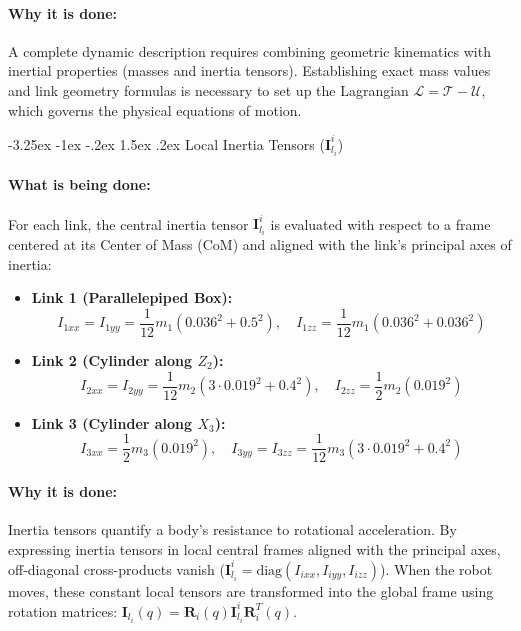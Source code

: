\documentclass[11pt, a4paper]{article}
\makeatletter
\renewcommand{\subsection}{\@startsection{subsection}{2}{\z@}%
    {-3.25ex \@plus -1ex \@minus -.2ex}%
    {1.5ex \@plus .2ex}%
    {\normalfont\large\bfseries\color{brandaccent}}}
\makeatother
\begin{document}
\paragraph{Why it is done:}
A complete dynamic description requires combining geometric kinematics with inertial properties (masses and inertia tensors). Establishing exact mass values and link geometry formulas is necessary to set up the Lagrangian $\mathcal{L} = \mathcal{T} - \mathcal{U}$, which governs the physical equations of motion.

\subsection{Local Inertia Tensors (\texorpdfstring{$\mathbf{I}_{l_i}^i$}{I\_li\_i})}
\paragraph{What is being done:}
For each link, the central inertia tensor $\mathbf{I}_{l_i}^i$ is evaluated with respect to a frame centered at its Center of Mass (CoM) and aligned with the link's principal axes of inertia:
\begin{itemize}[leftmargin=1.5em]
    \item \textbf{Link 1 (Parallelepiped Box):}
    \begin{equation}
        I_{1xx} = I_{1yy} = \frac{1}{12} m_1 (0.036^2 + 0.5^2), \quad I_{1zz} = \frac{1}{12} m_1 (0.036^2 + 0.036^2)
    \end{equation}
    \item \textbf{Link 2 (Cylinder along $Z_2$):}
    \begin{equation}
        I_{2xx} = I_{2yy} = \frac{1}{12} m_2 (3 \cdot 0.019^2 + 0.4^2), \quad I_{2zz} = \frac{1}{2} m_2 (0.019^2)
    \end{equation}
    \item \textbf{Link 3 (Cylinder along $X_3$):}
    \begin{equation}
        I_{3xx} = \frac{1}{2} m_3 (0.019^2), \quad I_{3yy} = I_{3zz} = \frac{1}{12} m_3 (3 \cdot 0.019^2 + 0.4^2)
    \end{equation}
\end{itemize}

\paragraph{Why it is done:}
Inertia tensors quantify a body's resistance to rotational acceleration. By expressing inertia tensors in local central frames aligned with the principal axes, off-diagonal cross-products vanish ($\mathbf{I}_{l_i}^i = \text{diag}(I_{ixx}, I_{iyy}, I_{izz})$). When the robot moves, these constant local tensors are transformed into the global frame using rotation matrices: $\mathbf{I}_{l_i}(q) = \mathbf{R}_i(q) \mathbf{I}_{l_i}^i \mathbf{R}_i^T(q)$.
\end{document}
